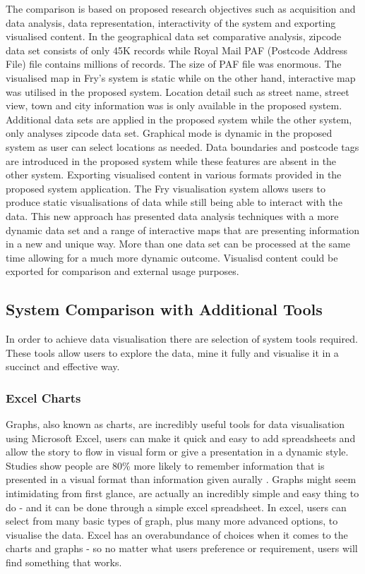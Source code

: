 The comparison is based on proposed research objectives such as acquisition and data analysis, data representation, interactivity of the system and exporting visualised content. In the geographical data set comparative analysis, zipcode data set consists of only 45K records while Royal Mail PAF (Postcode Address File) file contains millions of records. The size of PAF file was enormous. The visualised map in Fry's system is static while on the other hand, interactive map was utilised in the proposed system. Location detail such as street name, street view, town and city information was is only available in the proposed system. Additional data sets are applied in the proposed system while the other system, only analyses zipcode data set. Graphical mode is dynamic in the proposed system as user can select locations as needed. Data boundaries and postcode tags are introduced in the proposed system while these features are absent in the other system. Exporting visualised content in various formats provided in the proposed system application. The Fry visualisation system allows users to produce static visualisations of data while still being able to interact with the data. This new approach has presented data analysis techniques with a more dynamic data set and a range of interactive maps that are presenting information in a new and unique way. More than one data set can be processed at the same time allowing for a much more dynamic outcome. Visualisd content could be exported for comparison and external usage purposes. 

\subsection{System Comparison with Additional Tools}

In order to achieve data visualisation there are selection of system tools required. These tools allow users to explore the data, mine it fully and visualise it in a succinct and effective way. 

\subsubsection{Excel Charts}

Graphs, also known as charts, are incredibly useful tools for data visualisation using Microsoft Excel, users can make it quick and easy to add spreadsheets and allow the story to flow in visual form or give a presentation in a dynamic style. Studies show people are 80\% more likely to remember information that is presented in a visual format than information given aurally \cite{avons1980visualization}. Graphs might seem intimidating from first glance, are actually an incredibly simple and easy thing to do - and it can be done through a simple excel spreadsheet. In excel, users can select from many basic types of graph, plus many more advanced options, to visualise the data. Excel has an overabundance of choices when it comes to the charts and graphs - so no matter what users preference or requirement, users will find something that works. 

